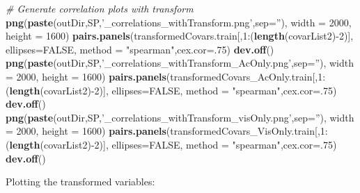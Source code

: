 \documentclass[11pt,]{article}
\newenvironment{Shaded}{\begin{snugshade}}{\end{snugshade}}
\newcommand{\KeywordTok}[1]{\textcolor[rgb]{0.13,0.29,0.53}{\textbf{{#1}}}}
\newcommand{\DataTypeTok}[1]{\textcolor[rgb]{0.13,0.29,0.53}{{#1}}}
\newcommand{\DecValTok}[1]{\textcolor[rgb]{0.00,0.00,0.81}{{#1}}}
\newcommand{\StringTok}[1]{\textcolor[rgb]{0.31,0.60,0.02}{{#1}}}
\newcommand{\CommentTok}[1]{\textcolor[rgb]{0.56,0.35,0.01}{\textit{{#1}}}}
\newcommand{\OtherTok}[1]{\textcolor[rgb]{0.56,0.35,0.01}{{#1}}}
\newcommand{\NormalTok}[1]{{#1}}
\begin{document}
\begin{Shaded}
\begin{Highlighting}[]
\CommentTok{# Generate correlation plots with transform}
\KeywordTok{png}\NormalTok{(}\KeywordTok{paste}\NormalTok{(outDir,SP,}\StringTok{'_correlations_withTransform.png'}\NormalTok{,}\DataTypeTok{sep=}\StringTok{''}\NormalTok{), }\DataTypeTok{width =} \DecValTok{2000}\NormalTok{, }\DataTypeTok{height =} \DecValTok{1600}\NormalTok{)}
\KeywordTok{pairs.panels}\NormalTok{(transformedCovars.train[,}\DecValTok{1}\NormalTok{:(}\KeywordTok{length}\NormalTok{(covarList2)-}\DecValTok{2}\NormalTok{)], }\DataTypeTok{ellipses=}\OtherTok{FALSE}\NormalTok{, }\DataTypeTok{method =} \StringTok{"spearman"}\NormalTok{,}\DataTypeTok{cex.cor=}\NormalTok{.}\DecValTok{75}\NormalTok{)}
\KeywordTok{dev.off}\NormalTok{() }
\KeywordTok{png}\NormalTok{(}\KeywordTok{paste}\NormalTok{(outDir,SP,}\StringTok{'_correlations_withTransform_AcOnly.png'}\NormalTok{,}\DataTypeTok{sep=}\StringTok{''}\NormalTok{), }\DataTypeTok{width =} \DecValTok{2000}\NormalTok{, }\DataTypeTok{height =} \DecValTok{1600}\NormalTok{)}
\KeywordTok{pairs.panels}\NormalTok{(transformedCovars_AcOnly.train[,}\DecValTok{1}\NormalTok{:(}\KeywordTok{length}\NormalTok{(covarList2)-}\DecValTok{2}\NormalTok{)], }\DataTypeTok{ellipses=}\OtherTok{FALSE}\NormalTok{, }\DataTypeTok{method =} \StringTok{"spearman"}\NormalTok{,}\DataTypeTok{cex.cor=}\NormalTok{.}\DecValTok{75}\NormalTok{)}
\KeywordTok{dev.off}\NormalTok{() }
\KeywordTok{png}\NormalTok{(}\KeywordTok{paste}\NormalTok{(outDir,SP,}\StringTok{'_correlations_withTransform_visOnly.png'}\NormalTok{,}\DataTypeTok{sep=}\StringTok{''}\NormalTok{), }\DataTypeTok{width =} \DecValTok{2000}\NormalTok{, }\DataTypeTok{height =} \DecValTok{1600}\NormalTok{)}
\KeywordTok{pairs.panels}\NormalTok{(transformedCovars_VisOnly.train[,}\DecValTok{1}\NormalTok{:(}\KeywordTok{length}\NormalTok{(covarList2)-}\DecValTok{2}\NormalTok{)], }\DataTypeTok{ellipses=}\OtherTok{FALSE}\NormalTok{, }\DataTypeTok{method =} \StringTok{"spearman"}\NormalTok{,}\DataTypeTok{cex.cor=}\NormalTok{.}\DecValTok{75}\NormalTok{)}
\KeywordTok{dev.off}\NormalTok{() }
\end{Highlighting}
\end{Shaded}

Plotting the transformed variables:
\end{document}
